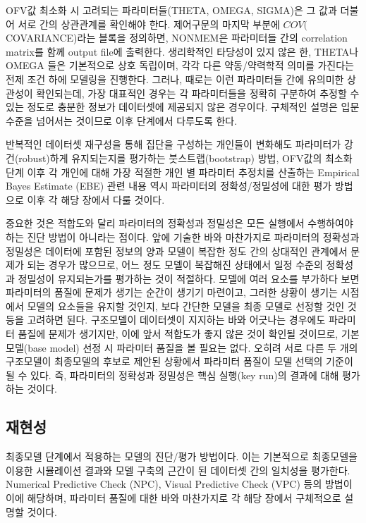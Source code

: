 \documentclass[
  10pt,
]{krantz}
\begin{document}
OFV값 최소화 시 고려되는 파라미터들(THETA, OMEGA, SIGMA)은 그 값과 더불어 서로 간의 상관관계를 확인해야
한다. 제어구문의 마지막 부분에 \(COV(\)COVARIANCE)라는 블록을 정의하면, NONMEM은 파라미터들 간의
correlation matrix를 함께 output file에 출력한다. 생리학적인 타당성이 있지 않은 한, THETA나
OMEGA 들은 기본적으로 상호 독립이며, 각각 다른 약동/약력학적 의미를 가진다는 전제 조건 하에 모델링을 진행한다. 그러나,
때로는 이런 파라미터들 간에 유의미한 상관성이 확인되는데, 가장 대표적인 경우는 각 파라미터들을 정확히 구분하여 추정할 수
있는 정도로 충분한 정보가 데이터셋에 제공되지 않은 경우이다. 구체적인 설명은 입문 수준을 넘어서는 것이므로 이후 단계에서
다루도록 한다.

반복적인 데이터셋 재구성을 통해 집단을 구성하는 개인들이 변화해도 파라미터가 강건(robust)하게 유지되는지를 평가하는
붓스트랩(bootstrap) 방법, OFV값의 최소화 단계 이후 각 개인에 대해 가장 적절한 개인 별 파라미터
추정치를 산출하는 Empirical Bayes Estimate (EBE) 관련 내용 역시 파라미터의 정확성/정밀성에
대한 평가 방법으로 이후 각 해당 장에서 다룰 것이다.

중요한 것은 적합도와 달리 파라미터의 정확성과 정밀성은 모든 실행에서 수행하여야 하는 진단 방법이 아니라는 점이다. 앞에 기술한
바와 마찬가지로 파라미터의 정확성과 정밀성은 데이터에 포함된 정보의 양과 모델이 복잡한 정도 간의 상대적인 관계에서 문제가
되는 경우가 많으므로, 어느 정도 모델이 복잡해진 상태에서 일정 수준의 정확성과 정밀성이 유지되는가를 평가하는 것이
적절하다. 모델에 여러 요소를 부가하다 보면 파라미터의 품질에 문제가 생기는 순간이 생기기 마련이고, 그러한 상황이
생기는 시점에서 모델의 요소들을 유지할 것인지, 보다 간단한 모델을 최종 모델로 선정할 것인 것 등을 고려하면 된다. 구조모델이
데이터셋이 지지하는 바와 어긋나는 경우에도 파라미터 품질에 문제가 생기지만, 이에 앞서 적합도가 좋지 않은 것이 확인될
것이므로, 기본모델(base model) 선정 시 파라미터 품질을 볼 필요는 없다. 오히려 서로 다른 두 개의
구조모델이 최종모델의 후보로 제안된 상황에서 파라미터 품질이 모델 선택의 기준이 될 수 있다. 즉, 파라미터의 정확성과
정밀성은 핵심 실행(key run)의 결과에 대해 평가하는 것이다.

\hypertarget{uxc7acuxd604uxc131}{%
\subsection{재현성}\label{uxc7acuxd604uxc131}}

최종모델 단계에서 적용하는 모델의 진단/평가 방법이다. 이는 기본적으로 최종모델을 이용한 시뮬레이션 결과와 모델 구축의 근간이 된
데이터셋 간의 일치성을 평가한다. Numerical Predictive Check (NPC), Visual Predictive
Check (VPC) 등의 방법이 이에 해당하며, 파라미터 품질에 대한 바와 마찬가지로 각 해당 장에서 구체적으로 설명할 것이다.
\end{document}
